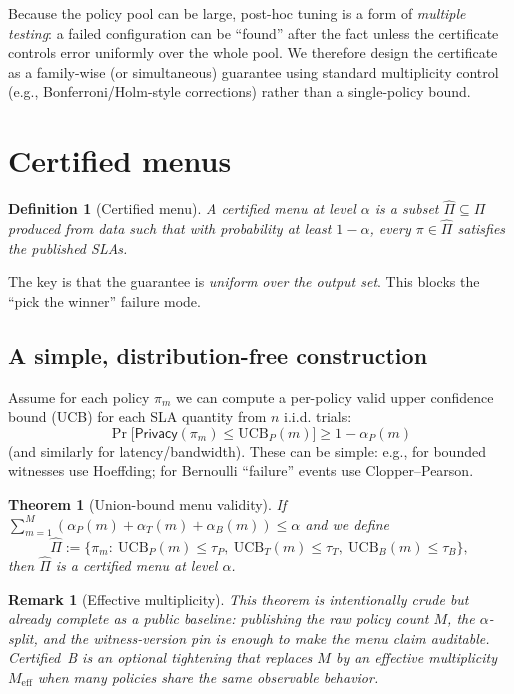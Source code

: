 \documentclass[11pt]{article}
\newtheorem{theorem}{Theorem}
\newtheorem{definition}{Definition}
\newtheorem{remark}{Remark}
\begin{document}
Because the policy pool can be large, post-hoc tuning is a form of \emph{multiple testing}: a failed configuration can be ``found'' after the fact unless the certificate controls error uniformly over the whole pool.
We therefore design the certificate as a family-wise (or simultaneous) guarantee using standard multiplicity control (e.g., Bonferroni/Holm-style corrections) rather than a single-policy bound.\cite{holm1979}

\section{Certified menus}
\begin{definition}[Certified menu]
A certified menu at level $\alpha$ is a subset $\widehat\Pi\subseteq\Pi$ produced from data such that with probability at least $1-\alpha$, every $\pi\in\widehat\Pi$ satisfies the published SLAs.
\end{definition}

The key is that the guarantee is \emph{uniform over the output set}.
This blocks the ``pick the winner'' failure mode.

\subsection{A simple, distribution-free construction}
Assume for each policy $\pi_m$ we can compute a per-policy valid upper confidence bound (UCB) for each SLA quantity from $n$ i.i.d. trials:
\[
\Pr\big[\textsf{Privacy}(\pi_m)\le \mathrm{UCB}_P(m)\big]\ge 1-\alpha_P(m)
\]
(and similarly for latency/bandwidth).
These can be simple: e.g., for bounded witnesses use Hoeffding; for Bernoulli ``failure'' events use Clopper--Pearson.

\begin{theorem}[Union-bound menu validity]
If $\sum_{m=1}^M (\alpha_P(m)+\alpha_T(m)+\alpha_B(m))\le \alpha$ and we define
\[
\widehat\Pi := \{\pi_m:\ \mathrm{UCB}_P(m)\le \tau_P,\ \mathrm{UCB}_T(m)\le \tau_T,\ \mathrm{UCB}_B(m)\le \tau_B\},
\]
then $\widehat\Pi$ is a certified menu at level $\alpha$.
\end{theorem}

\begin{remark}[Effective multiplicity]
This theorem is intentionally crude but already complete as a public baseline: publishing the raw policy count $M$, the $\alpha$-split, and the witness-version pin is enough to make the menu claim auditable. Certified~B is an optional tightening that replaces $M$ by an effective multiplicity $M_{\mathrm{eff}}$ when many policies share the same observable behavior.
\end{remark}
\end{document}
